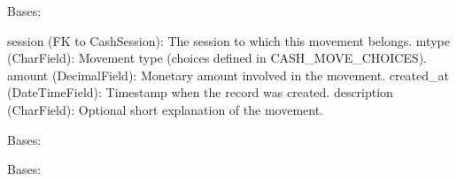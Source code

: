 \documentclass[a4paper,11pt,spanish]{sphinxmanual}
\begin{document}
\begin{fulllineitems}
\label{\detokenize{api/CashRegister/CashRegister.models:CashRegister.models.CashMovement}}
\pysigstartsignatures
\pysiglinewithargsret
{}
{\sphinxparamcomma {}}
{}
\pysigstopsignatures
\sphinxAtStartPar
Bases: 
\begin{description}
\sphinxAtStartPar
session (FK to CashSession): The session to which this movement belongs.
mtype (CharField): Movement type (choices defined in CASH\_MOVE\_CHOICES).
amount (DecimalField): Monetary amount involved in the movement.
created\_at (DateTimeField): Timestamp when the record was created.
description (CharField): Optional short explanation of the movement.

\end{description}

\begin{fulllineitems}
\label{\detokenize{api/CashRegister/CashRegister.models:CashRegister.models.CashMovement.DoesNotExist}}
\pysigstartsignatures
\pysigline
{}
\pysigstopsignatures
\sphinxAtStartPar
Bases: 

\end{fulllineitems}


\begin{fulllineitems}
\label{\detokenize{api/CashRegister/CashRegister.models:CashRegister.models.CashMovement.MultipleObjectsReturned}}
\pysigstartsignatures
\pysigline
{}
\pysigstopsignatures
\sphinxAtStartPar
Bases: 

\end{fulllineitems}



\end{fulllineitems}
\end{document}

